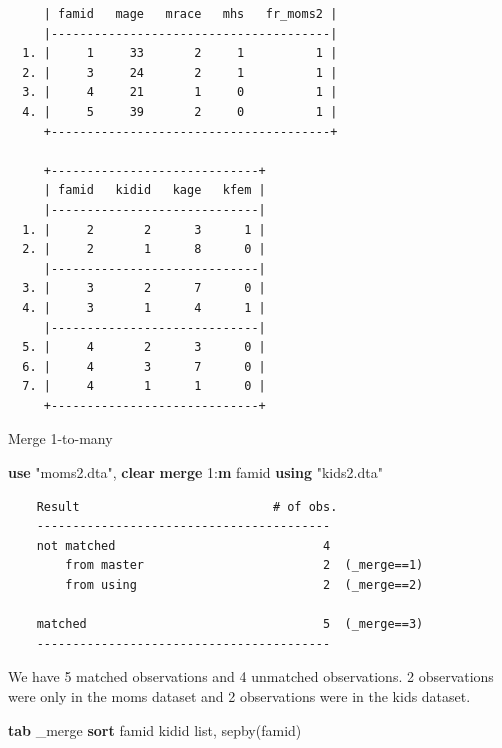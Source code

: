 \documentclass[
]{book}
\newenvironment{Shaded}{\begin{snugshade}}{\end{snugshade}}
\newcommand{\DataTypeTok}[1]{\textcolor[rgb]{0.13,0.29,0.53}{#1}}
\newcommand{\FunctionTok}[1]{\textcolor[rgb]{0.13,0.29,0.53}{\textbf{#1}}}
\newcommand{\KeywordTok}[1]{\textcolor[rgb]{0.13,0.29,0.53}{\textbf{#1}}}
\newcommand{\NormalTok}[1]{#1}
\newcommand{\OtherTok}[1]{\textcolor[rgb]{0.56,0.35,0.01}{#1}}
\newcommand{\StringTok}[1]{\textcolor[rgb]{0.31,0.60,0.02}{#1}}
\begin{document}
\begin{verbatim}
     | famid   mage   mrace   mhs   fr_moms2 |
     |---------------------------------------|
  1. |     1     33       2     1          1 |
  2. |     3     24       2     1          1 |
  3. |     4     21       1     0          1 |
  4. |     5     39       2     0          1 |
     +---------------------------------------+

     +-----------------------------+
     | famid   kidid   kage   kfem |
     |-----------------------------|
  1. |     2       2      3      1 |
  2. |     2       1      8      0 |
     |-----------------------------|
  3. |     3       2      7      0 |
  4. |     3       1      4      1 |
     |-----------------------------|
  5. |     4       2      3      0 |
  6. |     4       3      7      0 |
  7. |     4       1      1      0 |
     +-----------------------------+
\end{verbatim}

Merge 1-to-many

\begin{Shaded}
\begin{Highlighting}[]
\KeywordTok{use} \StringTok{"moms2.dta"}\NormalTok{, }\KeywordTok{clear}
\KeywordTok{merge}\NormalTok{ 1:}\FunctionTok{m}\NormalTok{ famid }\KeywordTok{using} \StringTok{"kids2.dta"}
\end{Highlighting}
\end{Shaded}

\begin{verbatim}
    Result                           # of obs.
    -----------------------------------------
    not matched                             4
        from master                         2  (_merge==1)
        from using                          2  (_merge==2)

    matched                                 5  (_merge==3)
    -----------------------------------------
\end{verbatim}

We have 5 matched observations and 4 unmatched observations. 2 observations were only in the moms dataset and 2 observations were in the kids dataset.

\begin{Shaded}
\begin{Highlighting}[]
\KeywordTok{tab} \DataTypeTok{\_merge}
\KeywordTok{sort}\NormalTok{ famid kidid}
\OtherTok{list}\NormalTok{, sepby(famid)}
\end{Highlighting}
\end{Shaded}
\end{document}
